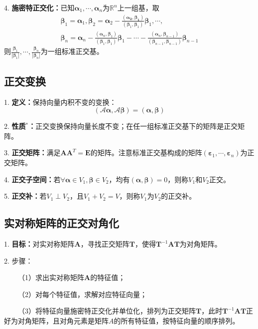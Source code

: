 4. \textbf{施密特正交化：}已知$\boldsymbol{\alpha}_1,\cdots,\boldsymbol{\alpha}_n$为$\mathbb{R}^n$上一组基，取
\begin{eqnarray*}
    \boldsymbol{\beta}_1=\boldsymbol{\alpha}_1,\boldsymbol{\beta}_2=\boldsymbol{\alpha}_2-\frac{(\boldsymbol{\alpha_2},\boldsymbol{\beta_1})}{(\boldsymbol{\beta}_1,\boldsymbol{\beta}_1)}\boldsymbol{\beta}_1,\cdots,\\
    \boldsymbol{\beta}_n=\boldsymbol{\alpha}_n-\frac{(\boldsymbol{\alpha}_n,\boldsymbol{\beta}_1)}{(\boldsymbol{\beta}_1,\boldsymbol{\beta}_1)}\boldsymbol{\beta}_1-\cdots-\frac{(\boldsymbol{\alpha}_n,\boldsymbol{\beta}_{n-1})}{(\boldsymbol{\beta}_{n-1},\boldsymbol{\beta}_{n-1})}\boldsymbol{\beta}_{n-1}
\end{eqnarray*}
则$\frac{\boldsymbol{\beta}_1}{|\boldsymbol{\beta}_1|},\cdots,\frac{\boldsymbol{\beta}_n}{|\boldsymbol{\beta}_n|}$为一组标准正交基。

\subsection{正交变换}

1. \textbf{定义：}保持向量内积不变的变换：
\begin{equation*}
    (\mathscr{A}\boldsymbol{\alpha},\mathscr{A}\boldsymbol{\beta})=(\boldsymbol{\alpha},\boldsymbol{\beta})
\end{equation*}

2. \textbf{性质$^*$：}正交变换保持向量长度不变；在任一组标准正交基下的矩阵是正交矩阵。

3. \textbf{正交矩阵：}满足$\boldsymbol{A}\boldsymbol{A}^T=\boldsymbol{E}$的矩阵。注意标准正交基构成的矩阵$(\boldsymbol{\varepsilon}_1,\cdots,\boldsymbol{\varepsilon}_n)$为正交矩阵。

4. \textbf{正交子空间：}若$\forall \boldsymbol{\alpha} \in V_1,\boldsymbol{\beta}\in V_2$，均有$(\boldsymbol{\alpha},\boldsymbol{\beta})=0$，则称$V_1$和$V_2$正交。

5. \textbf{正交补：}若$V_1\perp V_2$，且$V_1+V_2=V$，则称$V_1$为$V_2$的正交补。

\subsection{实对称矩阵的正交对角化}

1. \textbf{目标：}对实对称矩阵$\boldsymbol{A}$，寻找正交矩阵$\boldsymbol{T}$，使得$\boldsymbol{T}^{-1}\boldsymbol{A}\boldsymbol{T}$为对角矩阵。

2. 步骤：

~~~~（1）求出实对称矩阵$\boldsymbol{A}$的特征值；

~~~~（2）对每个特征值，求解对应特征向量；

~~~~（3）将特征向量施密特正交化并单位化，排列为正交矩阵$\boldsymbol{T}$，此时$\boldsymbol{T}^{-1}\boldsymbol{A}\boldsymbol{T}$正好为对角矩阵，且对角元素是矩阵$A$的所有特征值，按特征向量的顺序排列。